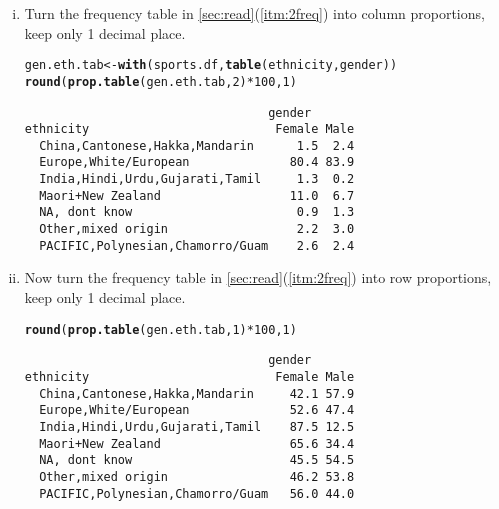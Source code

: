 \documentclass[12pt,a4paper]{article}\usepackage[]{graphicx}\usepackage[]{color}
\makeatletter
\newcommand{\hlnum}[1]{\textcolor[rgb]{0.686,0.059,0.569}{#1}}%
\newcommand{\hlopt}[1]{\textcolor[rgb]{0,0,0}{#1}}%
\newcommand{\hlstd}[1]{\textcolor[rgb]{0.345,0.345,0.345}{#1}}%
\newcommand{\hlkwb}[1]{\textcolor[rgb]{0.69,0.353,0.396}{#1}}%
\newcommand{\hlkwd}[1]{\textcolor[rgb]{0.737,0.353,0.396}{\textbf{#1}}}%
\newenvironment{kframe}{%
 \def\at@end@of@kframe{}%
 \ifinner\ifhmode%
  \def\at@end@of@kframe{\end{minipage}}%
  \begin{minipage}{\columnwidth}%
 \fi\fi%
 \def\FrameCommand##1{\hskip\@totalleftmargin \hskip-\fboxsep
 \colorbox{shadecolor}{##1}\hskip-\fboxsep
     \hskip-\linewidth \hskip-\@totalleftmargin \hskip\columnwidth}%
 \MakeFramed {\advance\hsize-\width
   \@totalleftmargin\z@ \linewidth\hsize
   \@setminipage}}%
 {\par\unskip\endMakeFramed%
 \at@end@of@kframe}
\newenvironment{knitrout}{}{} %
\makeatother
\begin{document}
\begin{enumerate}[(i)]
\item Turn the frequency table in \ref{sec:read}(\ref{itm:2freq})
into column proportions, keep only 1 decimal place.
\begin{knitrout}
\color{fgcolor}\begin{kframe}
\begin{alltt}
\hlstd{gen.eth.tab} \hlkwb{<-} \hlkwd{with}\hlstd{(sports.df,} \hlkwd{table}\hlstd{(ethnicity, gender))}
\hlkwd{round}\hlstd{(}\hlkwd{prop.table}\hlstd{(gen.eth.tab,} \hlnum{2}\hlstd{)}\hlopt{*}\hlnum{100}\hlstd{,} \hlnum{1}\hlstd{)}
\end{alltt}
\begin{verbatim}
                                  gender
ethnicity                          Female Male
  China,Cantonese,Hakka,Mandarin      1.5  2.4
  Europe,White/European              80.4 83.9
  India,Hindi,Urdu,Gujarati,Tamil     1.3  0.2
  Maori+New Zealand                  11.0  6.7
  NA, dont know                       0.9  1.3
  Other,mixed origin                  2.2  3.0
  PACIFIC,Polynesian,Chamorro/Guam    2.6  2.4
\end{verbatim}
\end{kframe}
\end{knitrout}

\item Now turn the frequency table in \ref{sec:read}(\ref{itm:2freq})
  into row proportions, keep only 1 decimal place.
\begin{knitrout}
\color{fgcolor}\begin{kframe}
\begin{alltt}
\hlkwd{round}\hlstd{(}\hlkwd{prop.table}\hlstd{(gen.eth.tab,} \hlnum{1}\hlstd{)}\hlopt{*}\hlnum{100}\hlstd{,} \hlnum{1}\hlstd{)}
\end{alltt}
\begin{verbatim}
                                  gender
ethnicity                          Female Male
  China,Cantonese,Hakka,Mandarin     42.1 57.9
  Europe,White/European              52.6 47.4
  India,Hindi,Urdu,Gujarati,Tamil    87.5 12.5
  Maori+New Zealand                  65.6 34.4
  NA, dont know                      45.5 54.5
  Other,mixed origin                 46.2 53.8
  PACIFIC,Polynesian,Chamorro/Guam   56.0 44.0
\end{verbatim}
\end{kframe}
\end{knitrout}

\end{enumerate}
\end{document}

